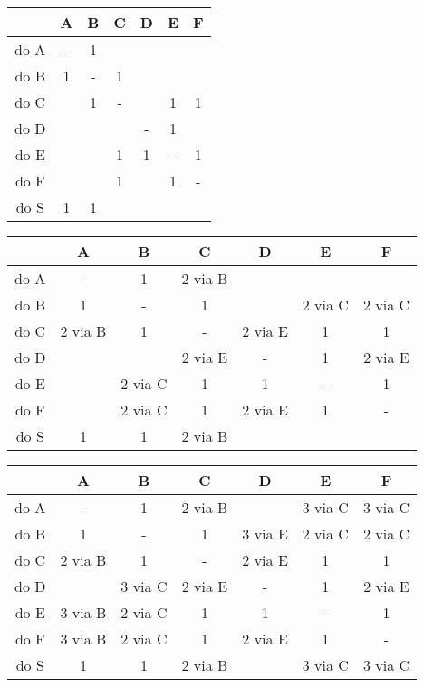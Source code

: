 \documentclass[12pt,a4paper]{article}
\begin{document}
\vskip 0.2cm
\begin{tabular}{ | c | c | c | c | c | c | c | }
 \hline
      & A & B & C & D & E & F \\
 \hline
 do A & - & 1 &   &   &   &   \\
 do B & 1 & - & 1 &   &   &   \\
 do C &   & 1 & - &   & 1 & 1 \\
 do D &   &   &   & - & 1 &   \\
 do E &   &   & 1 & 1 & - & 1 \\
 do F &   &   & 1 &   & 1 & - \\
 do S & 1 & 1 &   &   &   &   \\
 \hline
\end{tabular}

\vskip 0.2cm
\begin{tabular}{ | c | c | c | c | c | c | c | }
 \hline
      &     A   &     B    &    C    &    D    &     E   &    F    \\
 \hline
 do A & -       & 1        & 2 via B &         &         &         \\
 do B & 1       & -        & 1       &         & 2 via C & 2 via C \\
 do C & 2 via B & 1        & -       & 2 via E & 1       & 1       \\
 do D &         &          & 2 via E & -       & 1       & 2 via E \\
 do E &         & 2 via C  & 1       & 1       & -       & 1       \\
 do F &         & 2 via C  & 1       & 2 via E & 1       & -       \\
 do S & 1       & 1        & 2 via B &         &         &         \\
 \hline
\end{tabular}

\vskip 0.2cm
\begin{tabular}{ | c | c | c | c | c | c | c | }
 \hline
      &     A   &     B    &    C    &    D    &     E   &    F    \\
 \hline
 do A & -       & 1        & 2 via B &         & 3 via C & 3 via C \\
 do B & 1       & -        & 1       & 3 via E & 2 via C & 2 via C \\
 do C & 2 via B & 1        & -       & 2 via E & 1       & 1       \\
 do D &         & 3 via C  & 2 via E & -       & 1       & 2 via E \\
 do E & 3 via B & 2 via C  & 1       & 1       & -       & 1       \\
 do F & 3 via B & 2 via C  & 1       & 2 via E & 1       & -       \\
 do S & 1       & 1        & 2 via B &         & 3 via C & 3 via C \\
 \hline
\end{tabular}
\end{document}
